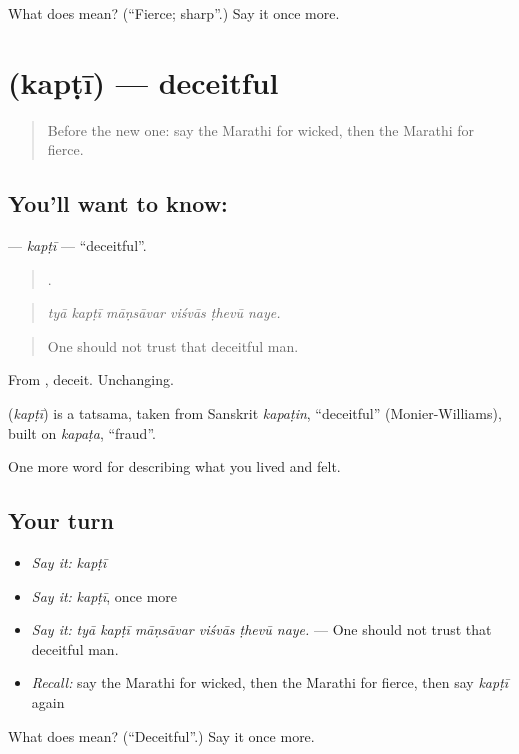 \begin{tcolorbox}[breakable,colback=teal!4,colframe=teal!35!black,title={Before you move on}]
What does  mean? (\textquotedblleft{}Fierce; sharp\textquotedblright{}.) Say it once more.
\end{tcolorbox}
\section[\texorpdfstring{\mr{कपटी} (kapṭī)}{कपटी (kapṭī)}]{ (kapṭī) — deceitful}

\label{lesson:MR-C469-kapti}



\begin{quote}
Before the new one: say the Marathi for wicked, then the Marathi for fierce.
\end{quote}

\subsection*{You'll want to know: }
\textbf{} — \emph{kapṭī} — \textquotedblleft{}deceitful\textquotedblright{}.

\begin{quote}
     .
\end{quote}

\begin{quote}
\emph{tyā kapṭī māṇsāvar viśvās ṭhevū naye.}
\end{quote}

\begin{quote}
One should not trust that deceitful man.
\end{quote}

From , deceit. Unchanging.

\begin{cousinweb}
\textbf{} (\emph{kapṭī}) is a tatsama, taken from Sanskrit \emph{kapaṭin}, \textquotedblleft{}deceitful\textquotedblright{} (Monier-Williams), built on \emph{kapaṭa}, \textquotedblleft{}fraud\textquotedblright{}.
\end{cousinweb}

\begin{grammarlens}[title={What you've built}]
One more word for describing what you lived and felt.
\end{grammarlens}

\subsection*{Your turn}
\begin{itemize}
\raggedright
  \item \emph{Say it:} \emph{kapṭī}
  \item \emph{Say it:} \emph{kapṭī}, once more
  \item \emph{Say it:} \emph{tyā kapṭī māṇsāvar viśvās ṭhevū naye.} — One should not trust that deceitful man.
  \item \emph{Recall:} say the Marathi for wicked, then the Marathi for fierce, then say \emph{kapṭī} again
\end{itemize}

\begin{tcolorbox}[breakable,colback=teal!4,colframe=teal!35!black,title={Before you move on}]
What does  mean? (\textquotedblleft{}Deceitful\textquotedblright{}.) Say it once more.
\end{tcolorbox}
